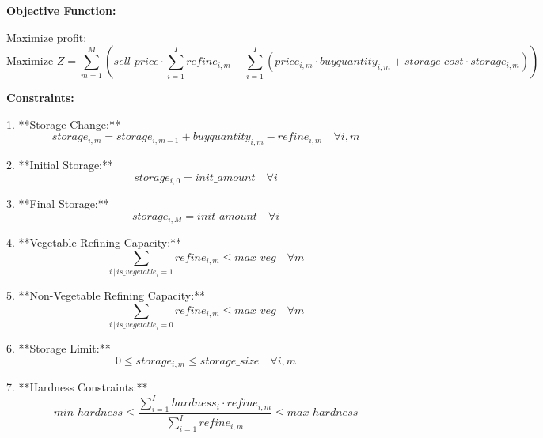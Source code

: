 \documentclass{article}
\begin{document}
\textbf{Objective Function:}

Maximize profit:
\[
\text{Maximize } Z = \sum_{m=1}^{M} \left( sell\_price \cdot \sum_{i=1}^{I} refine_{i,m} - \sum_{i=1}^{I} \left( price_{i,m} \cdot buyquantity_{i,m} + storage\_cost \cdot storage_{i,m} \right) \right)
\]

\textbf{Constraints:} 

1. **Storage Change:**
\[
storage_{i,m} = storage_{i,m-1} + buyquantity_{i,m} - refine_{i,m} \quad \forall i, m
\]

2. **Initial Storage:**
\[
storage_{i,0} = init\_amount \quad \forall i
\]

3. **Final Storage:**
\[
storage_{i,M} = init\_amount \quad \forall i
\]

4. **Vegetable Refining Capacity:**
\[
\sum_{i \, | \, is\_vegetable_i=1} refine_{i,m} \leq max\_veg \quad \forall m
\]

5. **Non-Vegetable Refining Capacity:**
\[
\sum_{i \, | \, is\_vegetable_i=0} refine_{i,m} \leq max\_veg \quad \forall m
\]

6. **Storage Limit:**
\[
0 \leq storage_{i,m} \leq storage\_size \quad \forall i, m
\]

7. **Hardness Constraints:**
\[
min\_hardness \leq \frac{\sum_{i=1}^{I} hardness_{i} \cdot refine_{i,m}}{\sum_{i=1}^{I} refine_{i,m}} \leq max\_hardness
\]
\end{document}

